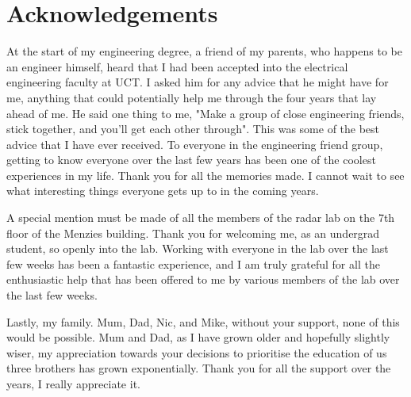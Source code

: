 \documentclass[class=report,11pt,crop=false]{standalone}
\begin{document}
\chapter*{Acknowledgements}
At the start of my engineering degree, a friend of my parents, who happens to be an engineer himself, heard that I had been accepted into the electrical engineering faculty at UCT. I asked him for any advice that he might have for me, anything that could potentially help me through the four years that lay ahead of me. He said one thing to me, "Make a group of close engineering friends, stick together, and you'll get each other through". This was some of the best advice that I have ever received. To everyone in the engineering friend group, getting to know everyone over the last few years has been one of the coolest experiences in my life. Thank you for all the memories made. I cannot wait to see what interesting things everyone gets up to in the coming years.

A special mention must be made of all the members of the radar lab on the 7th floor of the Menzies building. Thank you for welcoming me, as an undergrad student, so openly into the lab. Working with everyone in the lab over the last few weeks has been a fantastic experience, and I am truly grateful for all the enthusiastic help that has been offered to me by various members of the lab over the last few weeks.

Lastly, my family. Mum, Dad, Nic, and Mike, without your support, none of this would be possible. Mum and Dad, as I have grown older and hopefully slightly wiser, my appreciation towards your decisions to prioritise the education of us three brothers has grown exponentially. Thank you for all the support over the years, I really appreciate it.
\end{document}
